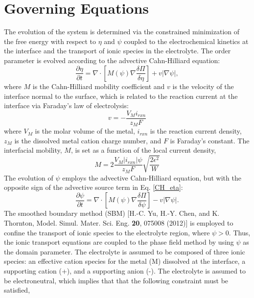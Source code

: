 \documentclass[11pt]{article}
\renewcommand{\=}[1]{\stackrel{#1}{=}} %
\theoremstyle{definition}
\theoremstyle{remark}
\begin{document}
\section{Governing Equations}
The evolution of the system is determined via the constrained minimization of the free energy with respect to $\eta$  and  $\psi$ coupled to the electrochemical kinetics at the interface and the transport of ionic species in the electrolyte. The order parameter is evolved according to the advective Cahn-Hilliard equation:
\begin{equation}
\label{CH_eta}
 \frac{\partial \eta}{\partial t} = \nabla \cdot \left[ M(\psi) \nabla \frac{\delta \Pi}{\delta \eta}\right] + v |\nabla \psi|,
 \end{equation}
\noindent where $M$ is the Cahn-Hilliard mobility coefficient and $v$ is the velocity of the interface normal to the surface, which is related to the reaction current at the interface via Faraday's law of electrolysis:
\begin{equation}
\label{int_vel}
v=-\frac{V_M i_{rxn}}{z_M F}
 \end{equation}
\noindent where $V_M$ is the molar volume of the metal, $i_{rxn}$ is the reaction current density, $z_M$ is the dissolved metal cation charge number, and $F$ is Faraday's constant. The interfacial mobility, $M$, is set as a function of the local current density,
\begin{equation}
M=2\frac{V_M |i_{rxn}| \psi}{z_M F}\sqrt{\frac{2 \epsilon^2}{W}}
\end{equation}
The evolution of $\psi$ employs the advective Cahn-Hilliard equation, but with the opposite sign of the advective source term in Eq. \eqref{CH_eta}:
\begin{equation}
\label{CH_psi}
 \frac{\partial \psi}{\partial t} = \nabla \cdot \left[ M(\psi) \nabla \frac{\delta \Pi}{\delta \psi} \right] - v |\nabla \psi|.
 \end{equation}
 The smoothed boundary method (SBM)  [H.-C. Yu, H.-Y. Chen, and K. Thornton, Model. Simul. Mater. Sci. Eng. {\bf 20}, 075008
(2012)] is employed to confine the transport of ionic species to the electrolyte region, where $\psi > 0$. Thus, the ionic transport equations are coupled to the phase field method by using  $\psi$ as the domain parameter. The electrolyte is assumed to be composed of three ionic species: an effective cation species for the metal (M) dissolved at the interface, a supporting cation (+), and a supporting anion (-). The electrolyte is assumed to be electroneutral, which implies that that the following constraint must be satisfied,
\end{document}
